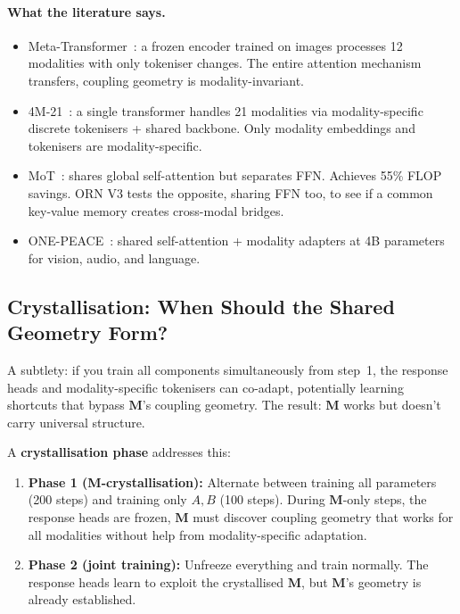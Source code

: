 \documentclass[11pt, a4paper]{article}
\newcommand{\M}{\mathbf{M}}
\theoremstyle{remark}
\begin{document}
\paragraph{What the literature says.}
\begin{itemize}[nosep]
    \item Meta-Transformer~\cite{zhang2023metatransformer}: a frozen encoder trained on images processes 12 modalities with only tokeniser changes.
    The entire attention mechanism transfers, coupling geometry is modality-invariant.
    \item 4M-21~\cite{bachmann2024fourm}: a single transformer handles 21 modalities via modality-specific discrete tokenisers + shared backbone.
    Only modality embeddings and tokenisers are modality-specific.
    \item MoT~\cite{liang2024mot}: shares global self-attention but separates FFN.
    Achieves 55\% FLOP savings.
    ORN V3 tests the opposite, sharing FFN too, to see if a common key-value memory creates cross-modal bridges.
    \item ONE-PEACE~\cite{wang2023onepeace}: shared self-attention + modality adapters at 4B parameters for vision, audio, and language.
\end{itemize}

\subsection{Crystallisation: When Should the Shared Geometry Form?}

A subtlety: if you train all components simultaneously from step~1, the response heads and modality-specific tokenisers can co-adapt, potentially learning shortcuts that bypass $\M$'s coupling geometry.
The result: $\M$ works but doesn't carry universal structure.

A \textbf{crystallisation phase} addresses this:
\begin{enumerate}[nosep]
    \item \textbf{Phase 1 (M-crystallisation):} Alternate between training all parameters (200 steps) and training only $A, B$ (100 steps).
    During $\M$-only steps, the response heads are frozen, $\M$ must discover coupling geometry that works for all modalities without help from modality-specific adaptation.
    \item \textbf{Phase 2 (joint training):} Unfreeze everything and train normally.
    The response heads learn to exploit the crystallised $\M$, but $\M$'s geometry is already established.
\end{enumerate}
\end{document}
